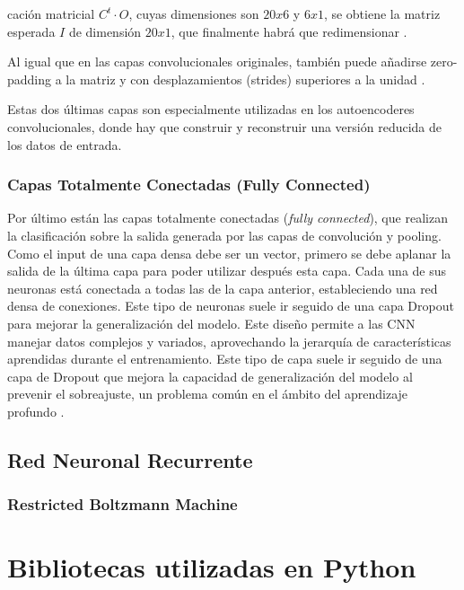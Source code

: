 cación matricial \(C^t \cdot O\), cuyas dimensiones son \(20x6\) y \(6x1\), se obtiene la matriz esperada $I$ de dimensión \(20x1\), que finalmente habrá que redimensionar \citep{pajares2021aprendizaje}.

Al igual que en las capas convolucionales originales, también puede añadirse zero-padding a la matriz y con desplazamientos (strides) superiores a la unidad \citep{pajares2021aprendizaje}.

Estas dos últimas capas son especialmente utilizadas en los autoencoderes convolucionales, donde hay que construir y reconstruir una versión reducida de los datos de entrada.

\subsubsection*{Capas Totalmente Conectadas (Fully Connected)}

Por último están las capas totalmente conectadas (\textit{fully connected}), que realizan la clasificación sobre la salida generada por las capas de convolución y pooling. Como el input de una capa densa debe ser un vector, primero se debe aplanar la salida de la última capa para poder utilizar después esta capa. Cada una de sus neuronas está conectada a todas las de la capa anterior, estableciendo una red densa de conexiones. Este tipo de neuronas suele ir seguido de una capa Dropout para mejorar la generalización del modelo. Este diseño permite a las CNN manejar datos complejos y variados, aprovechando la jerarquía de características aprendidas durante el entrenamiento. Este tipo de capa suele ir seguido de una capa de Dropout que mejora la capacidad de generalización del modelo al prevenir el sobreajuste, un problema común en el ámbito del aprendizaje profundo \citep{hossain2019classification}.



\subsection{Red Neuronal Recurrente}
\subsubsection{Restricted Boltzmann Machine}









\section{Bibliotecas utilizadas en Python} \label{Subsec: 3_3}

